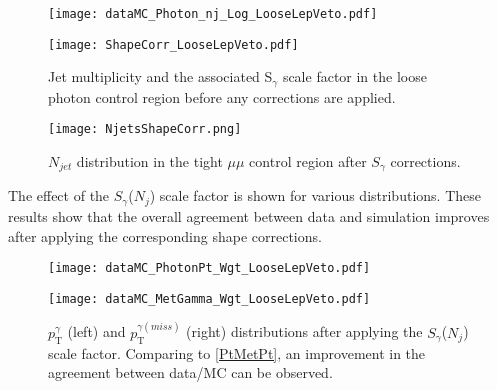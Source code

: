 \begin{figure}[H]
\begin{center}
\begin{minipage}[b]{0.45\textwidth}
\texttt{[image: dataMC\_Photon\_nj\_Log\_LooseLepVeto.pdf]}
\end{minipage}
\begin{minipage}[b]{0.5\textwidth}
    \texttt{[image: ShapeCorr\_LooseLepVeto.pdf]}
\end{minipage}
\end{center}
\vspace{-1em}
\caption{Jet multiplicity and the associated S$_\gamma$ scale factor in the loose photon control region before any corrections are applied.}
\label{NjetsCR}
\end{figure}


\begin{figure}[H]
\begin{center}
\texttt{[image: NjetsShapeCorr.png]}
\end{center}
\vspace{-1em}
\caption[$N_{jet}$ distribution in the tight $\mu\mu$ control region after $S_\gamma$ corrections.]{$N_{jet}$ distribution in the tight $\mu\mu$ control region after $S_\gamma$ corrections.}
\label{NjetsShapeCorr}
\end{figure}

The effect of the $S_{\gamma}$($N_j$) scale factor is shown for various distributions. These results show that the overall agreement between data and simulation improves after applying the corresponding shape corrections.

\begin{figure}[H]
\begin{center}
\begin{minipage}[b]{0.45\textwidth}
    \texttt{[image: dataMC\_PhotonPt\_Wgt\_LooseLepVeto.pdf]}
\end{minipage}
\begin{minipage}[b]{0.45\textwidth}
    \texttt{[image: dataMC\_MetGamma\_Wgt\_LooseLepVeto.pdf]}
\end{minipage}
\end{center}
\vspace{-1em}
\caption{$p_\text{T}^\gamma$ (left) and $p_\text{T}^{\gamma (miss)}$ (right) distributions after applying the $S_\gamma$($N_j$) scale factor. Comparing to \autoref{PtMetPt}, an improvement in the agreement between data/MC can be observed.}
\label{PtMetPtCorr}
\end{figure}

